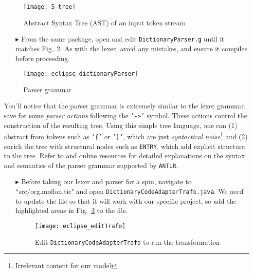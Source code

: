 \vspace{0.5cm}

\begin{figure}[htp]
\begin{center}
 \texttt{[image: 5-tree]}
  \caption{Abstract Syntax Tree (AST) of an input token stream}
  \label{fig:dictLexer}
\end{center}
\end{figure}

\begin{itemize}

\item[$\blacktriangleright$] From the same package, open and edit \texttt{DictionaryParser.g} until it matches Fig.~\ref{eclipse:dictParser}. As with the lexer,
avoid any mistakes, and ensure it compiles before proceeding.

\end{itemize}

\begin{figure}[!htbp]
\begin{center}
 \texttt{[image: eclipse\_dictionaryParser]}
  \caption{Parser grammar}
  \label{eclipse:dictParser}
\end{center}
\end{figure}

You'll notice that the parser grammar is extremely similar to the lexer grammar, save for some \emph{parser actions} following the \texttt{`->'} symbol. These
actions control the construction of the resulting tree. Using this simple tree language, one can (1) abstract from tokens such as \texttt{`\{'} or
\texttt{`\}'}, which are just \emph{syntactical noise}\footnote{Irrelevant content for our model} and (2) enrich the tree with structural nodes such as
\texttt{ENTRY}, which add explicit structure to the tree. Refer to \cite{ANTLR} and online resources for detailed explanations on the syntax and semantics of
the parser grammar supported by \texttt{ANTLR}.

\newpage

\begin{itemize}

\item[$\blacktriangleright$] Before taking our lexer and parser for a spin, navigate to ``src\-/org\-.mof\-lon\-.tie" and open
\texttt{DictionaryCodeAdapterTrafo.java}. We need to update the file so that it will work with our specific project, so add the highlighted areas in
Fig.~\ref{eclipse:defaultTGGMain} to the file.

\vspace{0.5cm}

\begin{figure}[!htbp]
\begin{center}
 \texttt{[image: eclipse\_editTrafo]}
  \caption{Edit \texttt{DictionaryCodeAdapterTrafo} to run the transformation}
  \label{eclipse:defaultTGGMain}
\end{center}
\end{figure}

\end{itemize}

